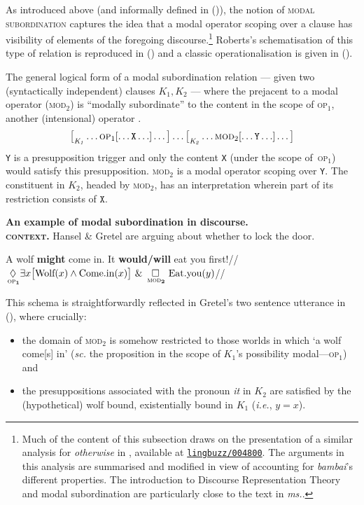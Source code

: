 As introduced above (and informally defined in (\lastx)), the notion of \textsc{modal subordination} captures the idea that a modal operator scoping over a clause has visibility of elements of the foregoing discourse.\footnote{Much of the content of this subsection draws on the presentation of a similar analysis for \textit{otherwise} in \citet{PhilKotek2019,PhilKotek}, available at \href{https://ling.auf.net/lingbuzz/004800}{\texttt{lingbuzz/004800}}. The arguments in this analysis are summarised and modified in view of accounting for \textit{bambai}'s different properties. The introduction to Discourse Representation Theory and modal subordination are particularly close to the text in \textit{ms.}\citeyear[§4]{PhilKotek}.} Roberts's schematisation of this type of relation is reproduced in () and a classic operationalisation is given in ().

\pex[labeltype=numeric,everylabel=\small] The general logical form of a modal subordination relation --- given two (syntactically independent) clauses $ \mathit{K_1,K_2} $ --- where the prejacent to a modal operator (\textsc{mod}$ _2 $) is ``modally subordinate'' to the content in the scope of \textsc{op}$ _1 $, another (intensional) operator \citep{Roberts2020}.
 $$ \big[_{\mathit{K_1}}\hdots \textsc{op}_1[\hdots \mathtt{X}\hdots]\hdots\big]\hdots\big[_{\mathit{K_2}}\hdots\textsc{mod}_2[\hdots\mathtt{Y}\hdots]\hdots\big] $$
\a\texttt{Y} is a presupposition trigger and only the content \texttt{X} (under the scope of~\textsc{op}$ _1 $) would satisfy this presupposition.
\a \textsc{mod}$ _{2} $ is a modal operator scoping over \texttt{Y}.
\a The constituent in $\mathit{K_2} $, headed by \textsc{mod}$ _2 $, has an interpretation wherein part of its restriction consists of $ \mathtt{X} $.
\xe


\pex[everylabel=\bf\sc]\textbf{ An example of modal subordination in discourse.}\\
\textbf{\textsc{context.}} Hansel \& Gretel are arguing about whether to lock the door.

\a[label=g] \begingl\gla A wolf \textbf{might} come in. It \textbf{would/will} eat you first!//
\glft $ \boldsymbol{\underset{\,\textsc{op}_1}{\lozenge}}\exists x\big[\text{Wolf}(x)\wedge\text{Come.in}(x)\big]\ \&\ \boldsymbol{\underset{\,\textsc{mod}_2}{\square}}\ \text{Eat.you}(y) $//\endgl
\xe


\noindent This schema is straightforwardly reflected in Gretel's two sentence utterance in (), where crucially:\begin{itemize} \item the domain of \textsc{mod}$ _2 $ is somehow restricted to those worlds in which `a wolf come[s] in' (\textit{sc.} the proposition in the scope of $ \mathit{K_1} $'s possibility modal---\textsc{op}$ _{1} $) and \item the presuppositions associated with the pronoun \textit{it} in $ \mathit{K_2} $ are satisfied by the (hypothetical) wolf bound, existentially bound in $ \mathit{K_1} $ (\textit{i.e.}, $ y=x $).\end{itemize}


